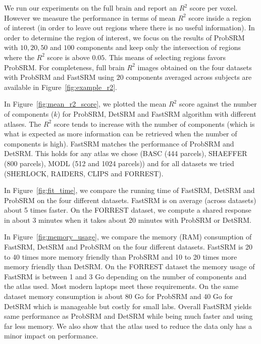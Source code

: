 We run our experiments on the full brain and report an $R^2$ score per voxel.
%
However we measure the performance in terms of mean $R^2$ score inside a region of interest (in order to leave out regions where there is no useful information).
%
In order to determine the region of interest, we focus on the results of ProbSRM with $10, 20, 50$ and $100$ components and keep only the intersection of regions where the $R^2$ score is above $0.05$.
%
This means of selecting regions favors ProbSRM. For completeness, full brain $R^2$ images obtained on the four datasets with ProbSRM and FastSRM using $20$ components averaged across subjects are available in Figure~\ref{fig:example_r2}.

In Figure~\ref{fig:mean_r2_score}, we plotted the mean $R^2$ score against the number of components ($k$) for ProbSRM, DetSRM and FastSRM algorithm with different atlases.
%
The $R^2$ score tends to increase with the number of components (which is what is expected as more information can be retrieved when the number of components is high).
%
FastSRM matches the performance of ProbSRM and DetSRM. This holds for any atlas we chose (BASC (444 parcels), SHAEFFER (800 parcels), MODL (512 and 1024 parcels)) and for all datasets we tried (SHERLOCK, RAIDERS, CLIPS and FORREST). 

In Figure~\ref{fig:fit_time}, we compare the running time of FastSRM, DetSRM and ProbSRM on the four different datasets.
%
FastSRM is on average (across datasets) about 5 times faster.
%
On the FORREST dataset, we compute a shared response in about 3 minutes when it takes about 20 minutes with ProbSRM or DetSRM.

In Figure~\ref{fig:memory_usage}, we compare the memory (RAM) consumption of FastSRM, DetSRM and ProbSRM on the four different datasets.
%
FastSRM is 20 to 40 times more memory friendly than ProbSRM and 10 to 20 times more memory friendly than DetSRM. On the FORREST dataset the memory usage of FastSRM is between 1 and 3 Go depending on the number of components and the atlas used. Most modern laptops meet these requirements. On the same dataset memory consumption is about 80 Go for ProbSRM and 40 Go for DetSRM which is manageable but costly for small labs.
%
Overall FastSRM yields same performance as ProbSRM and DetSRM while being much faster and using far less memory. We also show that the atlas used to reduce the data only has a minor impact on performance.

